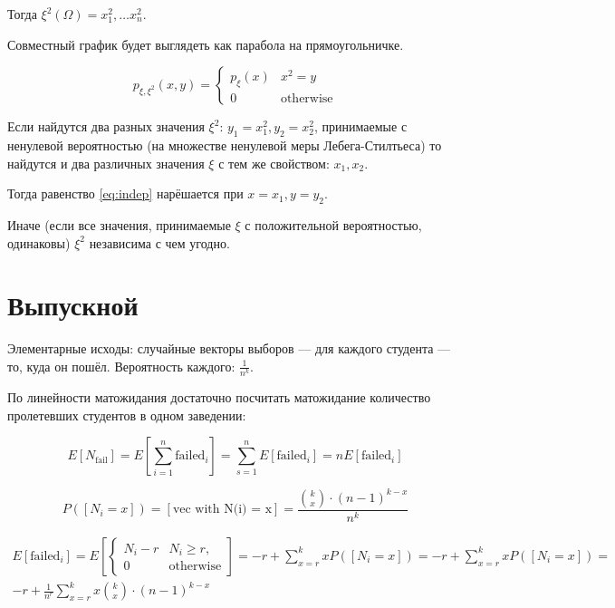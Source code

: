 \documentclass[12pt, a4paper]{article}
\begin{document}
Тогда $\xi^2(\Omega) = x_1^2, … x_n^2$.

Совместный график будет выглядеть как парабола на прямоугольничке.

\begin{equation}
  p_{\xi, \xi^2}(x, y) = \begin{cases}
    p_\xi(x) & x^2 = y \\
    0 & \text{otherwise}
  \end{cases}
\end{equation}

Если найдутся два разных значения $\xi^2$: $y_1 = x_1^2, y_2 = x_2^2$,
принимаемые с ненулевой вероятностью (на множестве ненулевой меры Лебега-Стилтьеса)
то найдутся и два различных значения $\xi$ с тем же свойством: $x_1, x_2$.

Тогда равенство \ref{eq:indep} нарёшается при $x = x_1, y = y_2$.

Иначе (если все значения, принимаемые $\xi$ с положительной вероятностью, одинаковы) $\xi^2$
независима с чем угодно.


\section{Выпускной}

Элементарные исходы: случайные векторы выборов — для каждого студента — то, куда он пошёл.
Вероятность каждого: $\frac{1}{n^k}$.

По линейности матожидания достаточно
посчитать матожидание количество пролетевших студентов в одном заведении:

\begin{equation}
  E[N_{\mathrm{fail}}] = E\left[\sum_{i = 1}^n \mathrm{failed}_i\right] = \sum_{s = 1}^n E[\mathrm{failed}_i] = n E[\mathrm{failed}_i]
\end{equation}

\begin{equation}
  P([N_i = x]) = [\text{vec with N(i) = x}] = \frac{\binom{k}{x} \cdot (n - 1)^{k - x}}{n^k}
\end{equation}

\begin{multline}
  E[\mathrm{failed}_i] = E\left[\begin{cases}
    N_i - r & N_i \geqslant r, \\
    0 & \text{otherwise}
  \end{cases}\right] = -r + \sum_{x = r}^{k} x P([N_i = x]) = -r + \sum_{x = r}^{k} x P([N_i = x]) = \\
  -r + \frac{1}{n^r}\sum_{x = r}^{k} x \binom{k}{x} \cdot (n - 1)^{k - x}
\end{multline}
\end{document}
